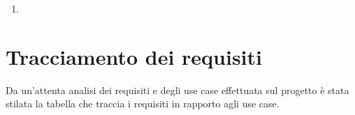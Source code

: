 \begin{usecase}{}{}\label{uc:}
    \usecasepre{}
    \usecasedesc{}
    \usecasepost{}

    \usecasemain{}
        \begin{enumerate}
            \item 
        \end{enumerate}

\end{usecase}








\section{Tracciamento dei requisiti}

Da un'attenta analisi dei requisiti e degli use case effettuata sul progetto è stata stilata la tabella che traccia i requisiti in rapporto agli use case.\\


